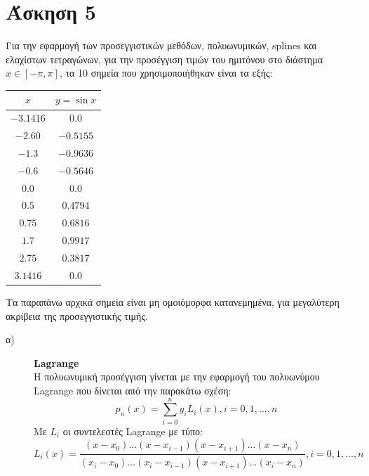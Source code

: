 \documentclass[a4paper,11pt]{article}
\newcommand{\lt}{\latintext}
\begin{document}
{\section*{Άσκηση 5}
Για την εφαρμογή των προσεγγιστικών μεθόδων, πολυωνυμικών, {\lt splines} και ελαχίστων τετραγώνων, για την προσέγγιση τιμών του ημιτόνου στο διάστημα $x\in[-\pi,\pi]$, τα 10 σημεία που χρησιμοποιήθηκαν είναι τα εξής:  
    \begin{center}
    \begin{tabular}{|c|c|}
          \hline
         $x$ & $y=\sin{x}$\\
          \hline
         $-3.1416$ & $0.0$ \\
          \hline
         $-2.60$ & $-0.5155$ \\
          \hline
         $-1.3$ & $-0.9636$ \\
          \hline
         $-0.6$ & $-0.5646$ \\
          \hline
          $0.0$ &  $0.0$ \\ 
          \hline
          $0.5$ &  $0.4794$ \\ 
          \hline
          $0.75$ &  $0.6816$ \\ 
          \hline
          $1.7$ &  $0.9917$ \\ 
          \hline
          $2.75$ &  $0.3817$ \\
          \hline
          $3.1416$ &  $0.0$ \\
          \hline
    \end{tabular}
    \end{center}
Τα παραπάνω αρχικά σημεία είναι μη ομοιόμορφα κατανεμημένα, για μεγαλύτερη ακρίβεια της προσεγγιστικής τιμής. \\
\begin{description}
\item[α)]{\textbf{\lt Lagrange}}\\
Η πολυωνυμική προσέγγιση γίνεται με την εφαρμογή του πολυωνύμου {\lt Lagrange} που δίνεται από την παρακάτω σχέση:
\begin{equation}
    p_n(x) = \sum_{i=0}^{n}y_iL_i(x), i=0,1,...,n  \tag{5.1}\label{eq:lagrange}
\end{equation}
Με $L_i$ οι συντελεστές {\lt Lagrange} με τύπο:
\begin{equation}
    L_i(x) = \frac{(x-x_0)...(x-x_{i-1})(x-x_{i+1})...(x-x_n)}
    {(x_i-x_0)...(x_i-x_{i-1})(x-x_{i+1})...(x_i-x_n)}, i=0,1,...,n    \tag{5.2}\label{eq:lagrange_Li}
\end{equation}


\end{description}}
\end{document}

